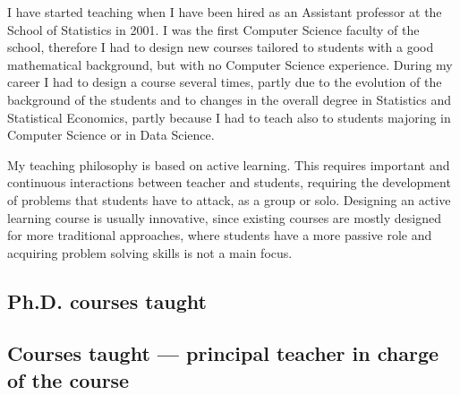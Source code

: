 \documentclass[11pt,a4paper,roman]{moderncv}
\begin{document}
I have started teaching when I have been hired as an Assistant professor at
  the School of Statistics in 2001.
  I was the first Computer Science faculty of the school, therefore I had to
  design new courses tailored to students with a good mathematical background,
  but with no Computer Science experience.
  During my career I had to design a course several times, partly due to the
  evolution of the background of the students and to changes in the overall
  degree in Statistics and Statistical Economics, partly because I had to teach
  also to students majoring in Computer Science or in Data Science.

  My teaching philosophy is based on active learning. This requires important
  and continuous interactions between teacher and students, requiring the
  development of problems that students have to attack, as a group or solo.
  Designing an active learning course is usually innovative, since existing
  courses are mostly designed for more traditional approaches, where students
  have a more passive role and acquiring problem solving skills is not a main focus.

  \subsection{Ph.D. courses taught}




\subsection{Courses taught --- principal teacher in charge of the
course}


\end{document}
